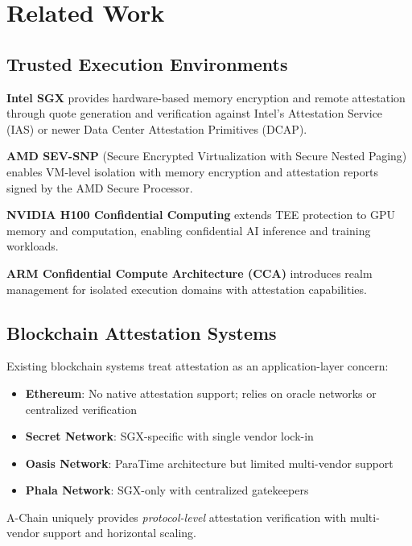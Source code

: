 \section{Related Work}


\subsection{Trusted Execution Environments}

\textbf{Intel SGX} provides hardware-based memory encryption and remote attestation through quote generation and verification against Intel's Attestation Service (IAS) or newer Data Center Attestation Primitives (DCAP).

\textbf{AMD SEV-SNP} (Secure Encrypted Virtualization with Secure Nested Paging) enables VM-level isolation with memory encryption and attestation reports signed by the AMD Secure Processor.

\textbf{NVIDIA H100 Confidential Computing} extends TEE protection to GPU memory and computation, enabling confidential AI inference and training workloads.

\textbf{ARM Confidential Compute Architecture (CCA)} introduces realm management for isolated execution domains with attestation capabilities.

\subsection{Blockchain Attestation Systems}

Existing blockchain systems treat attestation as an application-layer concern:

\begin{itemize}
\item \textbf{Ethereum}: No native attestation support; relies on oracle networks or centralized verification
\item \textbf{Secret Network}: SGX-specific with single vendor lock-in
\item \textbf{Oasis Network}: ParaTime architecture but limited multi-vendor support
\item \textbf{Phala Network}: SGX-only with centralized gatekeepers
\end{itemize}

A-Chain uniquely provides \textit{protocol-level} attestation verification with multi-vendor support and horizontal scaling.

